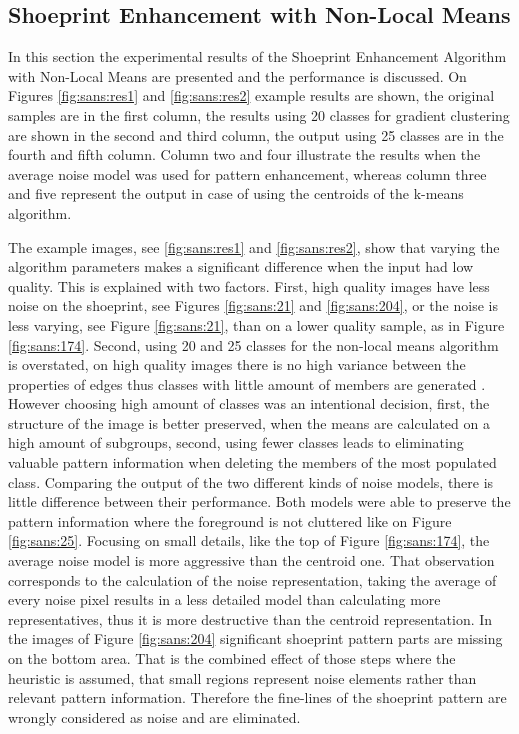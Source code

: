 \documentclass[draft,final]{vutinfth} %
\begin{document}
\subsection{Shoeprint Enhancement with Non-Local Means}
\par
In this section the experimental results of the Shoeprint Enhancement Algorithm with Non-Local Means are presented and the performance is discussed.
On Figures \ref{fig:sans:res1} and \ref{fig:sans:res2} example results are shown, the original samples are in the first column, the results using 20 classes for gradient clustering are shown in the second and third column, the output using 25 classes are in the fourth and fifth column.
Column two and four illustrate the results when the average noise model was used for pattern enhancement, whereas column three and five represent the output in case of using the centroids of the k-means algorithm.
\par
The example images, see  \ref{fig:sans:res1} and \ref{fig:sans:res2}, show that varying the algorithm parameters makes a significant difference when the input had low quality.
This is explained with two factors.
First, high quality images have less noise on the shoeprint, see Figures \ref{fig:sans:21} and \ref{fig:sans:204}, or the noise is less varying, see Figure \ref{fig:sans:21}, than on a lower quality sample, as in Figure \ref{fig:sans:174}.
Second, using 20 and 25 classes for the non-local means algorithm is overstated, on high quality images there is no high variance between the properties of edges thus classes with little amount of members are generated .
However choosing high amount of classes was an intentional decision, first, the structure of the image is better preserved, when the means are calculated on a high amount of subgroups, second, using fewer classes leads to eliminating valuable pattern information when deleting the members of the most populated class.
Comparing the output of the two different kinds of noise models, there is little difference between their performance.
Both models were able to preserve the pattern information where the foreground is not cluttered like on Figure \ref{fig:sans:25}.
Focusing on small details, like the top of Figure \ref{fig:sans:174}, the average noise model is more aggressive than the centroid one.
That observation corresponds to the calculation of the noise representation, taking the average of every noise pixel results in a less detailed model than calculating more representatives, thus it is more destructive than the centroid representation.
In the images of Figure \ref{fig:sans:204} significant shoeprint pattern parts are missing on the bottom area.
That is the combined effect of those steps where the heuristic is assumed, that small regions represent noise elements rather than relevant pattern information.
Therefore the fine-lines of the shoeprint pattern are wrongly considered as noise and are eliminated.
\end{document}
